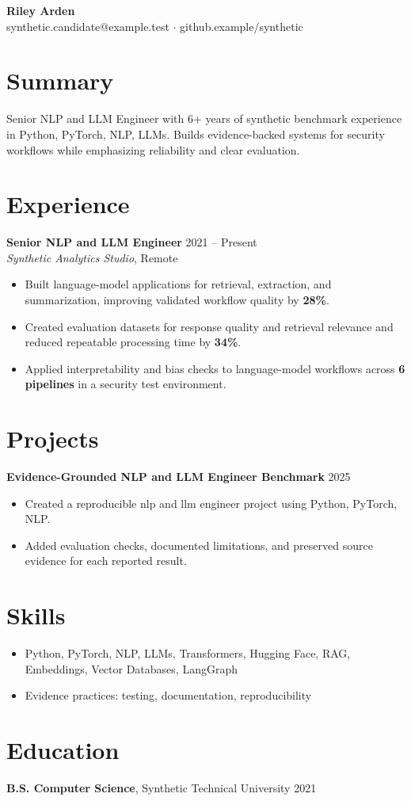 \documentclass[10pt,letterpaper]{article}
\begin{document}
\begin{center}
{\Large \textbf{Riley Arden}}\\
synthetic.candidate@example.test $\cdot$ github.example/synthetic
\end{center}

\section*{Summary}
Senior NLP and LLM Engineer with 6+ years of synthetic benchmark experience in Python, PyTorch, NLP, LLMs. Builds evidence-backed systems for security workflows while emphasizing reliability and clear evaluation.

\section*{Experience}
\textbf{Senior NLP and LLM Engineer} \hfill 2021 -- Present\\
\textit{Synthetic Analytics Studio}, Remote
\begin{itemize}
  \item Built language-model applications for retrieval, extraction, and summarization, improving validated workflow quality by \textbf{28\%}.
  \item Created evaluation datasets for response quality and retrieval relevance and reduced repeatable processing time by \textbf{34\%}.
  \item Applied interpretability and bias checks to language-model workflows across \textbf{6 pipelines} in a security test environment.
\end{itemize}

\section*{Projects}
\textbf{Evidence-Grounded NLP and LLM Engineer Benchmark} \hfill 2025
\begin{itemize}
  \item Created a reproducible nlp and llm engineer project using Python, PyTorch, NLP.
  \item Added evaluation checks, documented limitations, and preserved source evidence for each reported result.
\end{itemize}

\section*{Skills}
\begin{itemize}
  \item Python, PyTorch, NLP, LLMs, Transformers, Hugging Face, RAG, Embeddings, Vector Databases, LangGraph
  \item Evidence practices: testing, documentation, reproducibility
\end{itemize}

\section*{Education}
\textbf{B.S. Computer Science}, Synthetic Technical University \hfill 2021
\end{document}
